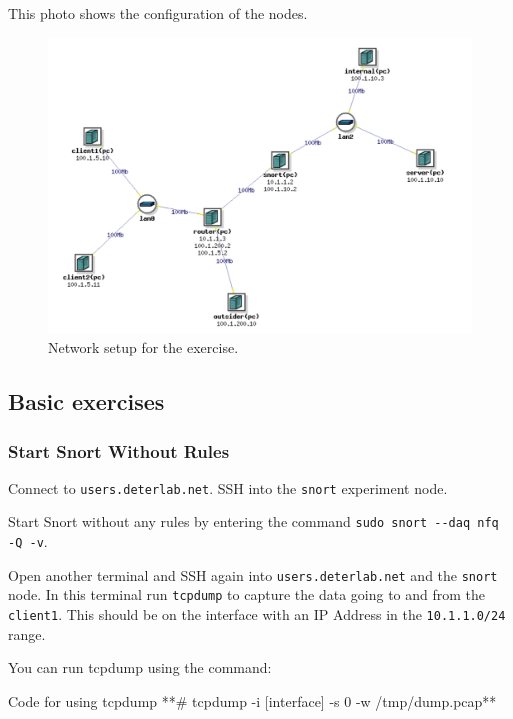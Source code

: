 \documentclass[a4paper,11pt,hidelinks]{article}
\begin{document}
This photo shows the configuration of the nodes.

\begin{figure}[ht!]
    \centering
    \includegraphics[width=\textwidth]{../drawable/network.png}
    \caption{Network setup for the exercise.}
\end{figure}

\clearpage
\newpage

\subsection{Basic exercises}

\subsubsection{Start Snort Without Rules}

Connect to \verb=users.deterlab.net=. SSH into the \verb=snort= experiment node.

Start Snort without any rules by entering the command \verb=sudo snort --daq nfq -Q -v=. 

Open another terminal and SSH again into \verb=users.deterlab.net= and the \verb=snort= node. In this terminal run \verb=tcpdump= to capture the data going to and from the \verb=client1=. This should be on the interface with an IP Address in the \verb=10.1.1.0/24= range. 

You can run tcpdump using the command:

\begin{code}{Code for using tcpdump}
**# tcpdump -i [interface] -s 0 -w /tmp/dump.pcap**
\end{code}
    
\end{document}

